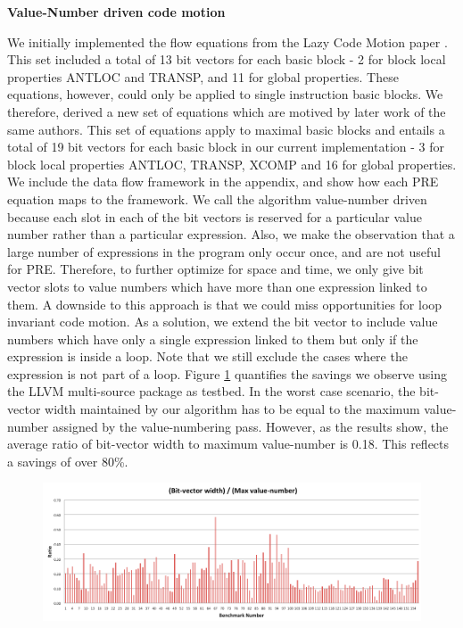 \documentclass[10pt,twoside]{report}
\begin{document}
\begin{flushleft}
\textbf{\large{Value-Number driven code motion}}
\end{flushleft}
We initially implemented the flow equations from the Lazy Code Motion paper \cite{Knoop}.
This set included a total of 13 bit vectors for each basic block - 2 for block local
properties ANTLOC and TRANSP, and 11 for global properties. These equations,
           however, could only be applied to single instruction basic blocks.
           We therefore, derived a new set of equations which are motived by
           later work\cite{Knoop:1994:OCM:183432.183443} of the same authors.
           This set of equations apply to maximal basic blocks and
           entails a total of 19 bit vectors for each basic block in our
           current implementation - 3 for block local properties ANTLOC,
           TRANSP, XCOMP and 16 for global properties.  We include the
           data flow framework in the appendix, and show how each PRE equation 
	  maps to the framework. We call the algorithm value-number driven because each
           slot in each of the bit vectors is reserved for a particular value
           number rather than a particular expression. Also, we make the
           observation that a large number of expressions in the program only
           occur once, and are not useful for PRE. Therefore, to further optimize
           for space and time, we only give bit vector slots to value numbers
           which have more than one expression linked to them. A downside to this
approach is that we could miss opportunities for loop invariant code motion. As a
      solution, we extend the bit vector to include value numbers which have
      only a single expression linked to them but only if the expression is
      inside a loop. Note that we still exclude the cases where the expression
      is not part of a loop. Figure \ref{fig:barC} quantifies the savings we observe using the LLVM
multi-source package as testbed. In the worst case scenario, the bit-vector width maintained by our 
algorithm has to be equal to the maximum value-number assigned by the value-numbering pass. However, as 
the results show, the average ratio of bit-vector width to maximum value-number is 0.18. This reflects a savings of
over 80\%.

\begin{figure}[htbp]
 \begin{center}
  \includegraphics[scale=0.4]{Figs/barC} 
 \end{center}
 \label{fig:barC} 
\end{figure}
\end{document}
